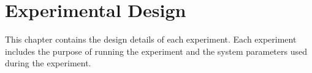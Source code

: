 \chapter{Experimental Design}

This chapter contains the design details of each experiment. Each experiment includes the purpose of running the experiment and the system parameters used during the experiment.




